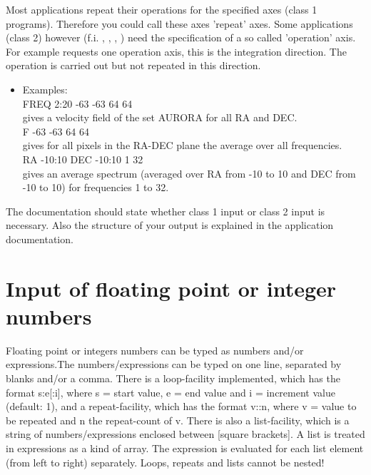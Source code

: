 Most applications repeat their operations for the specified axes (class 1 
programs). Therefore you could call these axes 'repeat' axes. Some 
applications (class 2) however (f.i. , ,
, ) need the 
specification of a so called 'operation' axis. For example 
 requests one 
operation axis, this is the integration direction. The operation is carried 
out but not repeated in this direction. 

\begin{itemize}
         
        \item Examples: \\

          FREQ 2:20 -63 -63 64 64 \\
        gives a velocity field of the set AURORA for all RA and DEC. \\
        
          F  -63 -63 64 64 \\
        gives for all pixels in the RA-DEC plane the average over all
        frequencies.\\
 
          RA -10:10 DEC -10:10  1 32 \\
        gives an average spectrum (averaged over RA from -10 to 10
        and DEC from -10 to 10) for frequencies 1 to 32. \\

\end{itemize}   
The documentation should state whether class 1 input or class 2
input is necessary. Also the structure of your output is 
explained in the application documentation.



\section{Input of floating point or integer numbers }
\label{sec:intinput}
Floating point or integers numbers can be typed as numbers and/or
expressions.The numbers/expressions can be typed on one line, separated by 
blanks and/or a comma. There is a loop-facility implemented, which has 
the format s:e[:i], where s = start value, e = end value and
i = increment value (default: 1), and a repeat-facility, which has the 
format v::n, where v = value to be repeated and n the repeat-count of v. 
There is also a list-facility, which is a string of numbers/expressions 
enclosed between [square brackets]. A list is treated in expressions as a 
kind of array. The expression is evaluated for each list element (from left 
to right) separately. Loops, repeats and lists cannot be nested!

